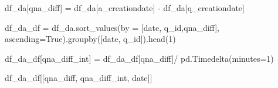 \documentclass[
  letterpaper,
  DIV=11,
  numbers=noendperiod]{scrartcl}
\newenvironment{Shaded}{\begin{snugshade}}{\end{snugshade}}
\newcommand{\DecValTok}[1]{\textcolor[rgb]{0.68,0.00,0.00}{#1}}
\newcommand{\NormalTok}[1]{\textcolor[rgb]{0.00,0.23,0.31}{#1}}
\newcommand{\OperatorTok}[1]{\textcolor[rgb]{0.37,0.37,0.37}{#1}}
\newcommand{\StringTok}[1]{\textcolor[rgb]{0.13,0.47,0.30}{#1}}
\newcommand{\VariableTok}[1]{\textcolor[rgb]{0.07,0.07,0.07}{#1}}
\begin{document}
\begin{Shaded}
\begin{Highlighting}[]
\NormalTok{df\_da[}\StringTok{\textquotesingle{}qna\_diff\textquotesingle{}}\NormalTok{] }\OperatorTok{=}\NormalTok{ df\_da[}\StringTok{\textquotesingle{}a\_creationdate\textquotesingle{}}\NormalTok{] }\OperatorTok{{-}}\NormalTok{ df\_da[}\StringTok{\textquotesingle{}q\_creationdate\textquotesingle{}}\NormalTok{]}
\end{Highlighting}
\end{Shaded}

\begin{Shaded}
\begin{Highlighting}[]
\NormalTok{df\_da\_df }\OperatorTok{=}\NormalTok{ df\_da.sort\_values(by }\OperatorTok{=}\NormalTok{ [}\StringTok{\textquotesingle{}date\textquotesingle{}}\NormalTok{, }\StringTok{\textquotesingle{}q\_id\textquotesingle{}}\NormalTok{,}\StringTok{\textquotesingle{}qna\_diff\textquotesingle{}}\NormalTok{], ascending}\OperatorTok{=}\VariableTok{True}\NormalTok{).groupby([}\StringTok{\textquotesingle{}date\textquotesingle{}}\NormalTok{, }\StringTok{\textquotesingle{}q\_id\textquotesingle{}}\NormalTok{]).head(}\DecValTok{1}\NormalTok{)}
\end{Highlighting}
\end{Shaded}

\begin{Shaded}
\begin{Highlighting}[]
\NormalTok{df\_da\_df[}\StringTok{\textquotesingle{}qna\_diff\_int\textquotesingle{}}\NormalTok{] }\OperatorTok{=}\NormalTok{ df\_da\_df[}\StringTok{\textquotesingle{}qna\_diff\textquotesingle{}}\NormalTok{]}\OperatorTok{/}\NormalTok{ pd.Timedelta(minutes}\OperatorTok{=}\DecValTok{1}\NormalTok{)}
\end{Highlighting}
\end{Shaded}

\begin{Shaded}
\begin{Highlighting}[]
\NormalTok{df\_da\_df[[}\StringTok{\textquotesingle{}qna\_diff\textquotesingle{}}\NormalTok{, }\StringTok{\textquotesingle{}qna\_diff\_int\textquotesingle{}}\NormalTok{, }\StringTok{\textquotesingle{}date\textquotesingle{}}\NormalTok{]]}
\end{Highlighting}
\end{Shaded}
\end{document}
